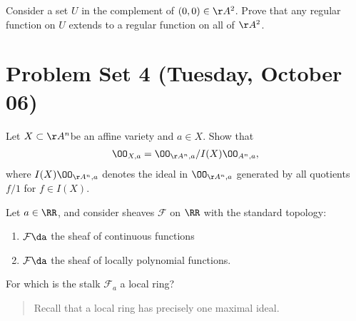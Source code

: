 \begin{exercise}[Problem 5]

Consider a set \(U\) in the complement of \((0, 0) \in \AA^2\). Prove
that any regular function on \(U\) extends to a regular function on all
of \(\AA^2\).

\end{exercise}

\hypertarget{problem-set-4-tuesday-october-06}{%
\section{Problem Set 4 (Tuesday, October
06)}\label{problem-set-4-tuesday-october-06}}

\begin{problem}[Gathmann 3.20]

Let \(X\subset \AA^n\)be an affine variety and \(a\in X\). Show that
\begin{align*}  
\OO_{X, a} = \OO_{\AA^n, a} / I(X) \OO_{A^n,a}
,\end{align*} where \(I(X) \OO_{\AA^n, a}\) denotes the ideal in
\(\OO_{\AA^n, a}\) generated by all quotients \(f/1\) for \(f\in I(X)\).

\end{problem}

\begin{problem}[Gathmann 3.21]

Let \(a\in \RR\), and consider sheaves \(\mathcal{F}\) on \(\RR\) with
the standard topology:

\begin{enumerate}
\def\labelenumi{\arabic{enumi}.}
\tightlist
\item
  \(\mathcal{F} \da\) the sheaf of continuous functions
\item
  \(\mathcal{F} \da\) the sheaf of locally polynomial functions.
\end{enumerate}

For which is the stalk \(\mathcal{F}_a\) a local ring?

\begin{quote}
Recall that a local ring has precisely one maximal ideal.
\end{quote}

\end{problem}

